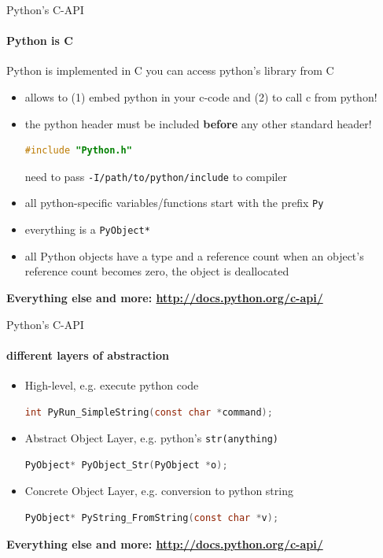 \documentclass[german]{beamer}
\newcommand{\ra}{\text{$\rightarrow$}}
\begin{document}
\begin{frame}[fragile]{Python's C-API}
  \framesubtitle{Python is C}

Python is implemented in C \ra you can access python's library from C
\begin{itemize}
\item allows to (1) embed python in your c-code and (2) to call c from python!
\item the python header must be included {\bf before} any other standard header!
  \begin{lstlisting}[language=c]
    #include "Python.h" 
  \end{lstlisting}
  \ra need to pass {\tt -I/path/to/python/include} to compiler

  \item all python-specific variables/functions start with the prefix
    {\tt Py}
  \item everything is a {\tt PyObject*}
  \item all Python objects have a type and a reference count
    \ra when an object's reference count becomes zero, the object is deallocated
\end{itemize}
\vfill
{\bf Everything else and more: \url{http://docs.python.org/c-api/}}
\end{frame}
\begin{frame}[fragile]{Python's C-API}
  \framesubtitle{different layers of abstraction}
  \begin{itemize}
    \item High-level, e.g. execute python code
      \begin{lstlisting}[language=c]
int PyRun_SimpleString(const char *command);
      \end{lstlisting}
    \item Abstract Object Layer, e.g. python's {\tt str(anything)}
      \begin{lstlisting}[language=c]
PyObject* PyObject_Str(PyObject *o);
      \end{lstlisting}
   \item Concrete Object Layer, e.g. conversion to python string
      \begin{lstlisting}[language=c]
PyObject* PyString_FromString(const char *v);
      \end{lstlisting}
  \end{itemize}
\vfill
{\bf Everything else and more: \url{http://docs.python.org/c-api/}}
\end{frame}
\end{document}
